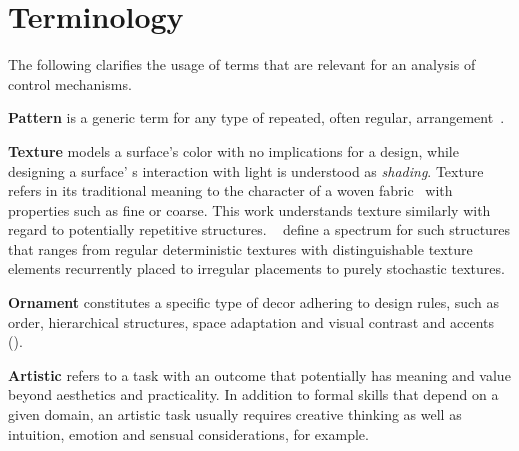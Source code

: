
\section{Terminology}\label{terminology}
The following clarifies the usage of terms that are relevant for an analysis of control mechanisms. %



\textbf{Pattern} is a generic term for any type of repeated, often regular, arrangement~\cite{oed_2017}.

\textbf{Texture}\label{par:taxo_terminology_texture} models a surface's color with no implications for a design, while designing a surface' s interaction with light is understood as \textit{shading}. Texture refers in its traditional meaning to the character of a woven fabric~\cite{oed_2017} with properties such as fine or coarse. This work understands texture similarly with regard to potentially repetitive structures. \citeauthor*{lin_2006_qeo}~\cite{lin_2006_qeo} define a spectrum for such structures that ranges from regular deterministic textures with distinguishable texture elements recurrently placed to irregular placements to purely stochastic textures.


\textbf{Ornament} constitutes a specific type of decor adhering to design rules, such as order, hierarchical structures, space adaptation and visual contrast and accents ().

\textbf{Artistic} refers to a task with an outcome that potentially has meaning and value beyond aesthetics and practicality. In addition to formal skills that depend on a given domain, an artistic task usually requires creative thinking as well as intuition, emotion and sensual considerations, for example.


